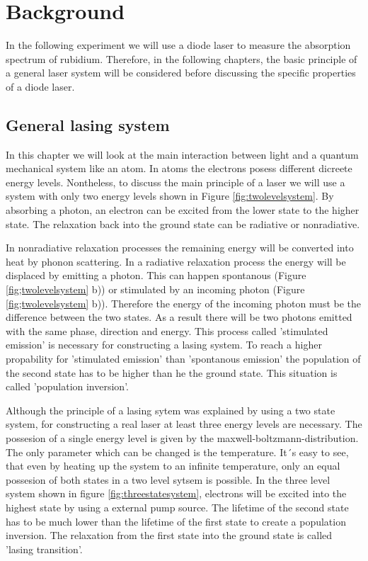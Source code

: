 \section{Background}

In the following experiment we will use a diode laser to measure the absorption
spectrum of rubidium. Therefore, in the following chapters, the basic principle
of a general laser system will be considered before discussing the specific
properties of a diode laser.

\subsection{General lasing system}

In this chapter we will look at the main interaction between light and a
quantum mechanical system like an atom. In atoms the electrons posess different
dicreete energy levels. Nontheless, to discuss the main principle of a laser
we will use a system with only two energy levels shown in Figure \ref{fig:twolevelsystem}.
By absorbing a photon, an electron can be excited from the lower state to the
higher state. The relaxation back into the ground state can be radiative or
nonradiative.

In nonradiative relaxation processes the remaining energy will be converted into
heat by phonon scattering. In a radiative relaxation process the energy will
be displaced by emitting a photon. This can happen spontanous (Figure \ref{fig;twolevelsystem} b))
or stimulated by an incoming photon (Figure \ref{fig;twolevelsystem} b)).
Therefore the energy of the incoming photon must be the difference between the
two states. As a result there will be two photons emitted with the same phase,
direction and energy. This process called 'stimulated emission' is necessary
for constructing a lasing system. To reach a higher propability for 'stimulated emission'
than 'spontanous emission' the population of the second state has to be higher
than he the ground state. This situation is called 'population inversion'.

Although the principle of a lasing sytem was explained by using a two state system,
for constructing a real laser at least three energy levels are necessary. The possesion
of a single energy level is given by the maxwell-boltzmann-distribution. The only
parameter which can be changed is the temperature. It´s easy to see, that even
by heating up the system to an infinite temperature, only an equal possesion
of both states in a two level sytsem is possible. In the three level system
shown in figure \ref{fig:threestatesystem},
electrons will be excited into the highest state by using a external pump source.
The lifetime of the second state has to be much lower than the lifetime of the
first state to create a population inversion. The relaxation from the first state
into the ground state is called 'lasing transition'.
